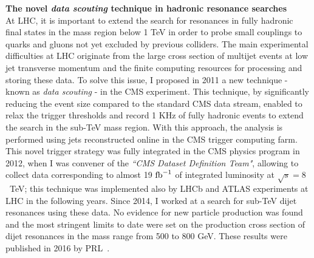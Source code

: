 \documentclass[10pt, a4paper]{article}
\begin{document}
{\bf The novel {\it data scouting} technique in hadronic resonance searches}\\[0.5em]
At LHC, it is important to extend the search for resonances in fully hadronic
final states in the mass region below 1 TeV in order to probe 
small couplings to quarks and gluons not yet excluded by previous colliders.
The main experimental difficulties at LHC originate
from the large cross section of multijet events at low jet transverse
momentum
and the finite computing resources for processing and storing these
data. To solve this issue, I proposed in 2011 a new technique - known as 
{\it data scouting} - in the CMS experiment. This technique, by significantly reducing the event size
compared to the standard CMS data stream, enabled to relax the
trigger thresholds and record 1 KHz of fully hadronic events to extend
the search in the sub-TeV mass region. With this approach, the
analysis is performed using jets reconstructed online in the CMS
trigger computing farm. %
This novel trigger strategy was fully integrated in the CMS physics program in
2012, when I was convener of the {\it``CMS Dataset Definition Team"}, 
allowing to collect data corresponding to almost 19 $\rm{fb}^{-1}$ of
integrated luminosity at $\sqrt{s}=8$~TeV; 
this technique was implemented also by LHCb and ATLAS
experiments at LHC in the following years.
Since 2014, I worked at a search for sub-TeV dijet resonances using these data.
No evidence for new particle production was found and the most
stringent limits to date were set on the production cross section of dijet resonances
in the mass range from 500 to 800 GeV. These results were published in
2016 by PRL~\cite{Khachatryan:2016ecr}. \\[1em]
\end{document}
